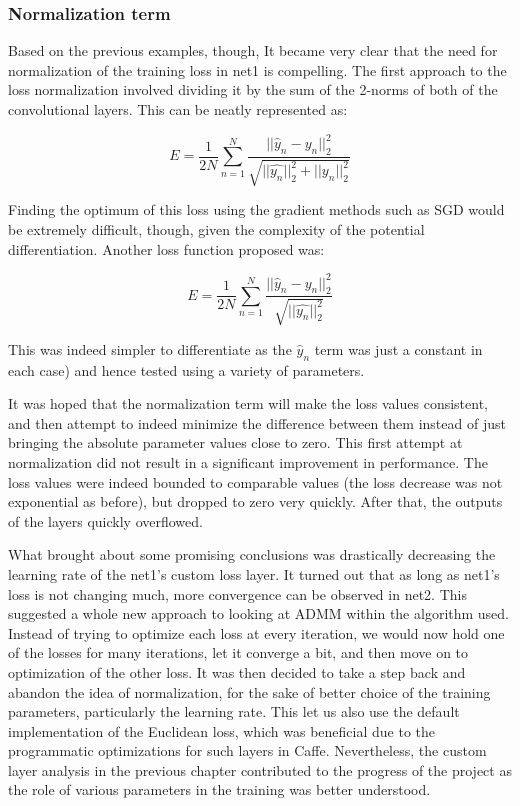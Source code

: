 \documentclass[a4paper, 12pt]{article}
\numberwithin{equation}{section}
\begin{document}
	\subsubsection{Normalization term }

	Based on the previous examples, though, It became very clear that the need for normalization of the training loss in net1 is compelling. The first approach to the loss normalization involved dividing it by the sum of the 2-norms of both of the convolutional layers. This can be neatly represented as:

	\begin{equation}
	E=\frac{1}{2N} \sum_{n=1}^{N} \frac{ ||\hat{y}_n-y_n||^2_2}{\sqrt{||\hat{y_n}||^2_2+||y_n||^2_2}}
	\end{equation}

	Finding the optimum of this loss using the gradient methods such as SGD would be extremely difficult, though, given the complexity of the potential differentiation. Another loss function proposed was:

	\begin{equation}
	E=\frac{1}{2N} \sum_{n=1}^{N} \frac{ ||\hat{y}_n-y_n||^2_2}{\sqrt{||\hat{y_n}||^2_2}}
	\end{equation}

	This was indeed simpler to differentiate as the $\hat{y}_n$ term was just a constant in each case) and hence tested using a variety of parameters.

	It was hoped that the normalization term will make the loss values consistent, and then attempt to indeed minimize the difference between them instead of just bringing the absolute parameter values close to zero. This first attempt at normalization did not result in a significant improvement in performance. The loss values were indeed bounded to comparable values (the loss decrease was not exponential as before), but dropped to zero very quickly. After that, the outputs of the layers quickly overflowed.

	What brought about some promising conclusions was drastically decreasing the learning rate of the net1's custom loss layer. It turned out that as long as net1's loss is not changing much, more convergence can be observed in net2. This suggested a whole new approach to looking at ADMM within the algorithm used. Instead of trying to optimize each loss at every iteration, we would now hold one of the losses for many iterations, let it converge a bit, and then move on to optimization of the other loss. It was then decided to take a step back and abandon the idea of normalization, for the sake of better choice of the training parameters, particularly the learning rate. This let us also use the default implementation of the Euclidean loss, which was beneficial due to the programmatic optimizations for such layers in Caffe. Nevertheless, the custom layer analysis in the previous chapter  contributed to the progress of the project as the role of various parameters in the training was better understood.
\end{document}
